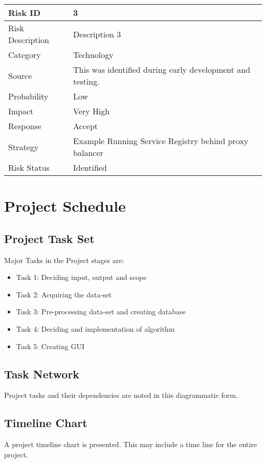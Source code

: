 \documentclass[oneside,a4paper,12pt]{book}
\begin{document}
\begin{enumerate}
\begin{table}[!htbp]
\begin{center}
\def\arraystretch{1.5}
\begin{tabularx}{\textwidth}{| l | X |}
\hline 
Risk ID	& 3 \\ \hline
Risk Description	& Description 3 \\ \hline
Category	& Technology \\ \hline
Source	& This was identified during early development and testing. \\ \hline
Probability	& Low \\ \hline
Impact	& Very High \\ \hline
Response	& Accept \\ \hline
Strategy	& Example Running Service Registry behind proxy balancer  \\ \hline
Risk Status	& Identified \\ \hline
\end{tabularx}
\end{center}
\label{tab:risk3}
\end{table}

\section{Project Schedule}  
\subsection{Project Task Set}  
Major Tasks in the Project stages are:
\begin{itemize}
  \item Task 1: Deciding input, output and scope
  \item Task 2: Acquiring the data-set
  \item Task 3: Pre-processing data-set and creating database
  \item Task 4: Deciding and implementation of algorithm
  \item Task 5: Creating GUI
\end{itemize}

\subsection{Task Network}  
Project tasks and their dependencies are noted in this diagrammatic form.
\subsection{Timeline Chart}  
A project timeline chart is presented. This may include a time line for the entire project.


\end{enumerate}
\end{document}
